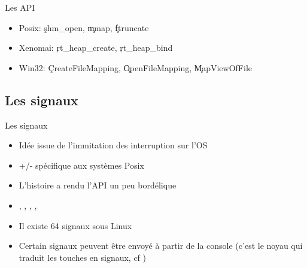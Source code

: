 \begin{frame}[fragile=singleslide]{Les API}
  \begin{itemize} 
  \item Posix: \c{shm_open}, \c{mmap}, \c{ftruncate}
  \item Xenomai: \c{rt_heap_create}, \c{rt_heap_bind}
  \item     Win32:     \c{CreateFileMapping},     \c{OpenFileMapping},
    \c{MapViewOfFile}
  \end{itemize} 
\end{frame} 

\subsection{Les signaux}

\begin{frame}[fragile=singleslide]{Les signaux}
  \begin{itemize}
  \item Idée issue de l'immitation des interruption sur l'OS
  \item +/- spécifique aux systèmes Posix
  \item L'histoire a rendu l'API un peu bordélique
  \item     {},     ,    ,
    , 
  \item Il existe 64 signaux sous Linux
  \item Certain  signaux peuvent  être envoyé à  partir de  la console
    (c'est  le   noyau  qui  traduit   les  touches  en   signaux,  cf
    )
  \end{itemize}
\end{frame}

